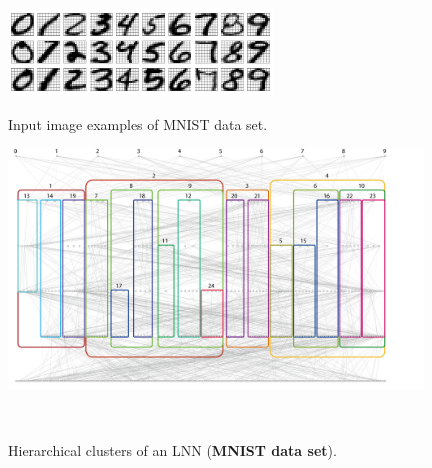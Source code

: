\documentclass{article}
\begin{document}
\begin{figure}[t]
\centering
\includegraphics[width=70mm]{mnist_input_data_samples.png}\vspace{-0.02\hsize}
\caption{Input image examples of MNIST data set. }\vspace{0.01\hsize}
\label{fig:mnist_samples}
\includegraphics[width=110mm]{mnist_align_lnn.png}\vspace{-0.02\hsize}
\caption{Hierarchical clusters of an LNN (\textbf{MNIST data set}). }\vspace{0.01\hsize}
\label{fig:mnist_align_lnn}
\\


\end{figure}
\end{document}
